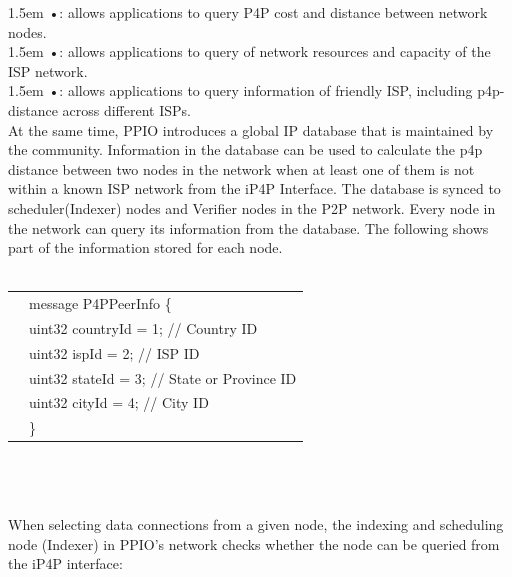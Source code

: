 \documentclass[10pt,a4paper]{article}
\begin{document}
\hangindent 1.5em
\noindent   
•: allows applications to query P4P cost and distance between network nodes.
\vspace{-0.8em}
\\

\hangindent 1.5em
\noindent   
•: allows applications to query of network resources and capacity of the ISP network.
\vspace{-0.8em}
\\

\hangindent 1.5em
\noindent   
•: allows applications to query information of friendly ISP, including p4p-distance across different ISPs.
\vspace{-0.6em}
\\

\noindent 
At the same time, PPIO introduces a global IP database that is maintained by the community. Information in the database can be used to calculate the p4p distance between two nodes in the network when at least one of them is not within a known ISP network from the iP4P Interface. The database is synced to scheduler(Indexer) nodes and Verifier nodes in the P2P network. Every node in the network can query its information from the database. The following shows part of the information stored for each node.\\\\
\begin{tabular}{r|l}
&message P4PPeerInfo   \{ \\
	&\qquad uint32 countryId = 1;   //  Country ID \\
	&\qquad uint32 ispId = 2;       //  ISP ID  \\ 
	&\qquad uint32 stateId = 3;     // State or  Province ID \\
	&\qquad uint32 cityId = 4;      // City ID  \\ 
	&\}   \\ 
	
\end{tabular} \\
  \vspace{-0.5em}
\\\\
\noindent 
When selecting data connections from a given node, the indexing and scheduling node (Indexer) in PPIO’s network checks whether the node can be queried from the iP4P interface:  
\vspace{-0.8em}
\\  
\end{document}

